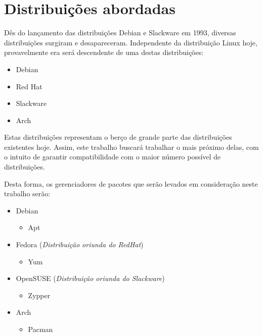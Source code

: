 \chapter{Distribuições abordadas} %
\label{sec:distribui_es_abordadas}

Dês do lançamento das distribuições Debian e Slackware em 1993, diversas distribuições surgiram e desapareceram. Independente da distribuição Linux hoje, provavelmente era será descendente de uma destas distribuições:

\begin{itemize}
	\item Debian
	\item Red Hat
	\item Slackware
	\item Arch
\end{itemize}

Estas distribuições representam o berço de grande parte das distribuições existentes hoje. Assim, este trabalho buscará trabalhar o mais próximo delas, com o intuito de garantir compatibilidade com o maior número possível de distribuições.

Desta forma, os gerenciadores de pacotes que serão levados em consideração neste trabalho serão:

\begin{itemize}
	\item Debian
	\begin{itemize}
		\item Apt
	\end{itemize}
	\item Fedora (\textit{Distribuição oriunda do RedHat})
	\begin{itemize}
		\item Yum
	\end{itemize}
	\item OpenSUSE (\textit{Distribuição oriunda do Slackware})
	\begin{itemize}
		\item Zypper
	\end{itemize}
	\item Arch
	\begin{itemize}
		\item Pacman
	\end{itemize}
\end{itemize}
